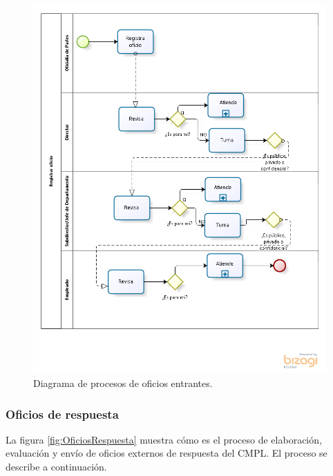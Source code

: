 	\begin{figure}[htbp!]
		\centering
			\includegraphics[width=1\textwidth]{images/antecedentes/registraroficio.png}
		\caption{Diagrama de procesos de oficios entrantes.}
		\label{fig:OficiosEntrantes}
	\end{figure}
	
	\subsubsection{Oficios de respuesta}
	La figura \ref{fig:OficiosRespuesta} muestra cómo es el proceso de elaboración, evaluación y envío de oficios externos de respuesta del CMPL. El proceso se describe a continuación.
	
